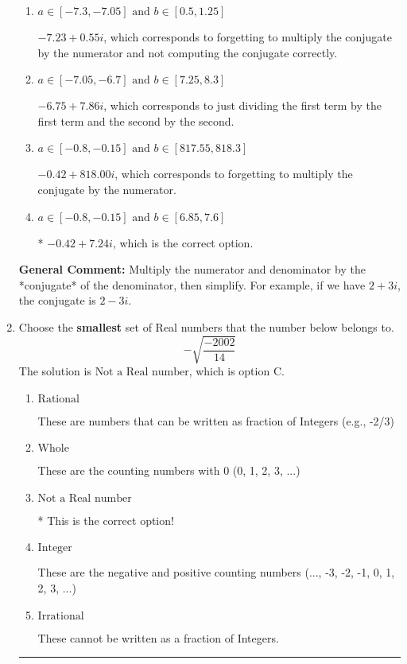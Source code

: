 \documentclass{extbook}[14pt]
\newcommand{\litem}[1]{\item #1

\rule{\textwidth}{0.4pt}}
\begin{document}
\begin{enumerate}
{\begin{enumerate}[label=\Alph*.]
 $-47.00  + 7.24 i$, which corresponds to forgetting to multiply the conjugate by the numerator and using a plus instead of a minus in the denominator.
\item \( a \in [-7.3, -7.05] \text{ and } b \in [0.5, 1.25] \)

 $-7.23  + 0.55 i$, which corresponds to forgetting to multiply the conjugate by the numerator and not computing the conjugate correctly.
\item \( a \in [-7.05, -6.7] \text{ and } b \in [7.25, 8.3] \)

 $-6.75  + 7.86 i$, which corresponds to just dividing the first term by the first term and the second by the second.
\item \( a \in [-0.8, -0.15] \text{ and } b \in [817.55, 818.3] \)

 $-0.42  + 818.00 i$, which corresponds to forgetting to multiply the conjugate by the numerator.
\item \( a \in [-0.8, -0.15] \text{ and } b \in [6.85, 7.6] \)

* $-0.42  + 7.24 i$, which is the correct option.
\end{enumerate}

\textbf{General Comment:} Multiply the numerator and denominator by the *conjugate* of the denominator, then simplify. For example, if we have $2+3i$, the conjugate is $2-3i$.
}
\litem{
Choose the \textbf{smallest} set of Real numbers that the number below belongs to.
\[ -\sqrt{\frac{-2002}{14}} \]
The solution is \( \text{Not a Real number} \), which is option C.\begin{enumerate}[label=\Alph*.]
\item \( \text{Rational} \)

These are numbers that can be written as fraction of Integers (e.g., -2/3)
\item \( \text{Whole} \)

These are the counting numbers with 0 (0, 1, 2, 3, ...)
\item \( \text{Not a Real number} \)

* This is the correct option!
\item \( \text{Integer} \)

These are the negative and positive counting numbers (..., -3, -2, -1, 0, 1, 2, 3, ...)
\item \( \text{Irrational} \)

These cannot be written as a fraction of Integers.
\end{enumerate}

}
\end{enumerate}
\end{document}
